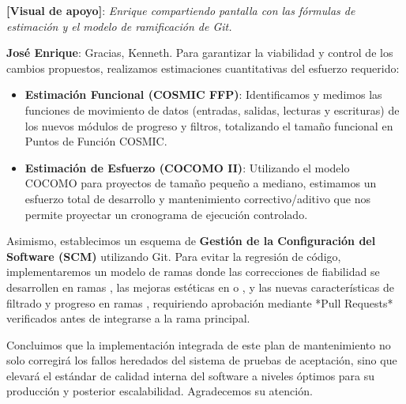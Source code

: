 \documentclass[12pt]{article}
\begin{document}
\noindent \textbf{[Visual de apoyo]}: \textit{Enrique compartiendo pantalla con las fórmulas de estimación y el modelo de ramificación de Git.}
\medskip

\noindent \textbf{José Enrique}: Gracias, Kenneth. Para garantizar la viabilidad y control de los cambios propuestos, realizamos estimaciones cuantitativas del esfuerzo requerido:

\begin{itemize}
    \item \textbf{Estimación Funcional (COSMIC FFP)}: Identificamos y medimos las funciones de movimiento de datos (entradas, salidas, lecturas y escrituras) de los nuevos módulos de progreso y filtros, totalizando el tamaño funcional en Puntos de Función COSMIC.
    \item \textbf{Estimación de Esfuerzo (COCOMO II)}: Utilizando el modelo COCOMO para proyectos de tamaño pequeño a mediano, estimamos un esfuerzo total de desarrollo y mantenimiento correctivo/aditivo que nos permite proyectar un cronograma de ejecución controlado.
\end{itemize}

Asimismo, establecimos un esquema de \textbf{Gestión de la Configuración del Software (SCM)} utilizando Git. Para evitar la regresión de código, implementaremos un modelo de ramas donde las correcciones de fiabilidad se desarrollen en ramas , las mejoras estéticas en  o , y las nuevas características de filtrado y progreso en ramas , requiriendo aprobación mediante *Pull Requests* verificados antes de integrarse a la rama principal.

Concluimos que la implementación integrada de este plan de mantenimiento no solo corregirá los fallos heredados del sistema de pruebas de aceptación, sino que elevará el estándar de calidad interna del software a niveles óptimos para su producción y posterior escalabilidad. Agradecemos su atención.
\end{document}
